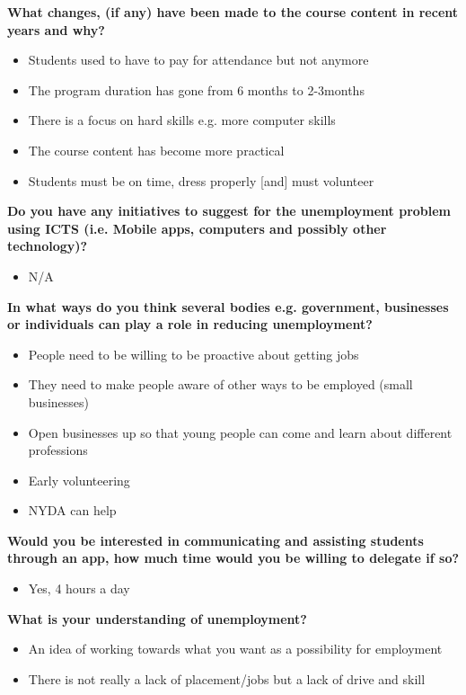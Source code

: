 \noindent\textbf{What changes, (if any) have been made to the course content in recent years and why?}
\begin{itemize}
\item Students used to have to pay for attendance but not anymore
\item The program duration has gone from 6 months to 2-3months
\item There is a focus on hard skills e.g. more computer skills
\item The course content has become more practical
\item Students must be on time, dress properly [and] must volunteer
\end{itemize}



\noindent\textbf{Do you have any initiatives to suggest for the unemployment problem using ICTS (i.e. Mobile apps, computers and possibly other technology)?}
\begin{itemize}
\item N/A
\end{itemize}

\noindent\textbf{In what ways do you think several bodies e.g. government, businesses or individuals can play a role in reducing unemployment?}
\begin{itemize}
\item People need to be willing to be proactive about getting jobs
\item They need to make people aware of other ways to be employed (small businesses)
\item Open businesses up so that young people can come and learn about different professions
\item Early volunteering
\item NYDA can help
\end{itemize}

\noindent\textbf{Would you be interested in communicating and assisting students through an app, how much time would you be willing to delegate if so?}
\begin{itemize}
\item Yes, 4 hours a day
\end{itemize}

\noindent\textbf{What is your understanding of unemployment?}
\begin{itemize}
\item An idea of working towards what you want as a possibility for employment
\item There is not really a lack of placement/jobs but a lack of drive and skill
\end{itemize}

